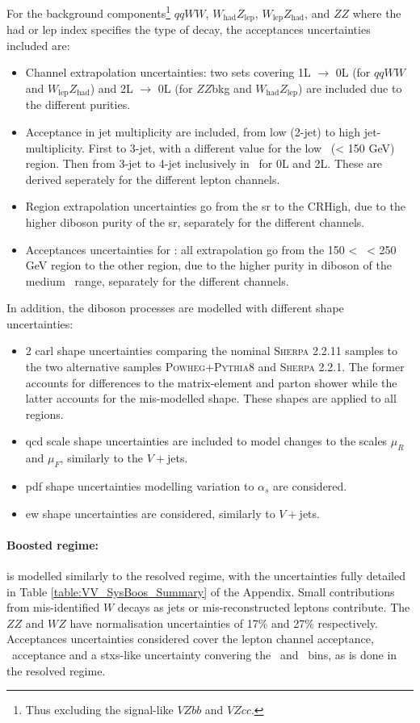 For the background components\footnote{Thus excluding the signal-like $VZbb$ and $VZcc$.} $qqWW$, $W_{\text{had}}Z_{\text{lep}}$, $W_{\text{lep}}Z_{\text{had}}$, and $ZZ$ where the had or lep index specifies the type of decay, the acceptances uncertainties included are:
\begin{itemize}[leftmargin=*]
    \item Channel extrapolation uncertainties: two sets covering 1L $\rightarrow$ 0L (for $qqWW$ and $W_{\text{lep}}Z_{\text{had}}$) and 2L $\rightarrow$ 0L (for $ZZ$bkg and $W_{\text{had}}Z_{\text{lep}}$) are included due to the different purities.
    \item Acceptance in jet multiplicity are included, from low (2-jet) to high jet-multiplicity. First to 3-jet, with a different value for the low \ptv\ (< 150 GeV) region. Then from 3-jet to 4-jet inclusively in \ptv\ for 0L and 2L. These are derived seperately for the different lepton channels. %
    \item Region extrapolation uncertainties go from the \gls{sr} to the CRHigh, due to the higher diboson purity of the \gls{sr}, separately for the different channels.
    \item Acceptances uncertainties for \ptv: all extrapolation go from the 150 < \ptv\ < 250 GeV region to the other region, due to the higher purity in diboson of the medium \ptv\ range, separately for the different channels.
\end{itemize}

In addition, the diboson processes are modelled with different shape uncertainties:
\begin{itemize}
    \item 2 \gls{carl} shape uncertainties comparing the nominal \textsc{Sherpa} 2.2.11 samples to the two alternative samples \textsc{Powheg}+\textsc{Pythia}8 and \textsc{Sherpa} 2.2.1. The former accounts for differences to the matrix-element and parton shower while the latter accounts for the mis-modelled \ptv shape. These shapes are applied to all regions.
    \item \gls{qcd} scale shape uncertainties are included to model changes to the scales $\mu_R$ and $\mu_F$, similarly to the $V+$jets.
    \item \gls{pdf} shape uncertainties modelling variation to $\alpha_s$ are considered.
    \item \gls{ew} shape uncertainties are considered, similarly to $V+$jets.
\end{itemize}

\paragraph{Boosted regime:} is modelled similarly to the resolved regime, with the uncertainties fully detailed in Table \ref{table:VV_SysBoos_Summary} of the Appendix. Small contributions from mis-identified $W$ decays as jets or mis-reconstructed leptons contribute. The $ZZ$ and $WZ$ have normalisation uncertainties of 17\% and 27\% respectively. Acceptances uncertainties considered cover the lepton channel acceptance, \ptv\ acceptance and a \gls{stxs}-like uncertainty convering the \ptv\ and \nj\ bins, as is done in the resolved regime.